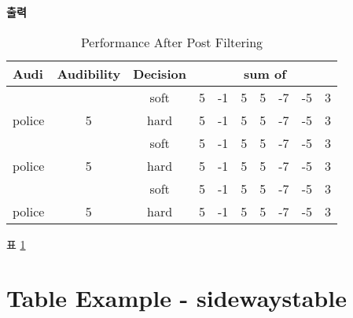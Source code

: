 		\textbf{출력}\\
		\vspace{-2.0em}
		\begin{table}[h]
			\caption{Performance After Post Filtering}
			\centering
			\begin{tabular}{ l c c rrrrrrr }
			\hline \hline
			Audi & Audibility & Decision & \multicolumn{7}{c}{ sum of }  \\ [0.5ex]
			\hline
			& 	& soft 	&  5 & -1 & 5  & 5 & -7 & -5 & 3 \\[-1.0ex]
			\raisebox{1.5ex} {police} & \raisebox{1.5ex} {5} 
				& hard	&  5 & -1 & 5  & 5 & -7 & -5 & 3 \\[1.0ex]
			& 	& soft 	&  5 & -1 & 5  & 5 & -7 & -5 & 3 \\[-1.0ex]
			\raisebox{4.0ex} {police} & \raisebox{2.0ex} {5} 
				& hard	&  5 & -1 & 5  & 5 & -7 & -5 & 3 \\[1.0ex]
			& 	& soft 	&  5 & -1 & 5  & 5 & -7 & -5 & 3 \\[-1.0ex]
			\raisebox{0.0ex} {police} & \raisebox{2.0ex} {5} 
				& hard	&  5 & -1 	& 5  & 5 & -7 & -5 & 3 \\[0.0ex]
			\hline
			\end{tabular}%
			\label{tab:PPer}%
		\end{table}%


표 \ref{tab:PPer}


\newpage
\section{Table Example - sidewaystable}

